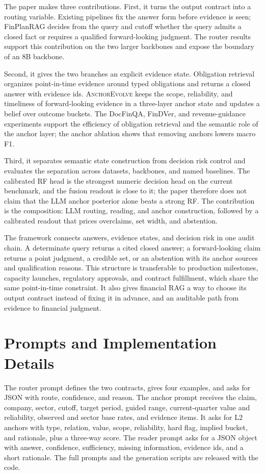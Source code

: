 \documentclass[11pt]{article}
\newcommand{\method}{FinPlanRAG}
\newcommand{\anchor}{\textsc{AnchorEvolve}}
\begin{document}
The paper makes three contributions. First, it turns the output contract into a routing variable. Existing pipelines fix the answer form before evidence is seen; \method{} decides from the query and cutoff whether the query admits a closed fact or requires a qualified forward-looking judgment. The router results support this contribution on the two larger backbones and expose the boundary of an 8B backbone.

Second, it gives the two branches an explicit evidence state. Obligation retrieval organizes point-in-time evidence around typed obligations and returns a closed answer with evidence ids. \anchor{} keeps the scope, reliability, and timeliness of forward-looking evidence in a three-layer anchor state and updates a belief over outcome buckets. The DocFinQA, FinDVer, and revenue-guidance experiments support the efficiency of obligation retrieval and the semantic role of the anchor layer; the anchor ablation shows that removing anchors lowers macro F1.

Third, it separates semantic state construction from decision risk control and evaluates the separation across datasets, backbones, and named baselines. The calibrated RF head is the strongest numeric decision head on the current benchmark, and the fusion readout is close to it; the paper therefore does not claim that the LLM anchor posterior alone beats a strong RF. The contribution is the composition: LLM routing, reading, and anchor construction, followed by a calibrated readout that prices overclaims, set width, and abstention.

The framework connects answers, evidence states, and decision risk in one audit chain. A determinate query returns a cited closed answer; a forward-looking claim returns a point judgment, a credible set, or an abstention with its anchor sources and qualification reasons. This structure is transferable to production milestones, capacity launches, regulatory approvals, and contract fulfillment, which share the same point-in-time constraint. It also gives financial RAG a way to choose its output contract instead of fixing it in advance, and an auditable path from evidence to financial judgment.



\appendix

\section{Prompts and Implementation Details}
The router prompt defines the two contracts, gives four examples, and asks for JSON with route, confidence, and reason. The anchor prompt receives the claim, company, sector, cutoff, target period, guided range, current-quarter value and reliability, observed and sector base rates, and evidence items. It asks for L2 anchors with type, relation, value, scope, reliability, hard flag, implied bucket, and rationale, plus a three-way score. The reader prompt asks for a JSON object with answer, confidence, sufficiency, missing information, evidence ids, and a short rationale. The full prompts and the generation scripts are released with the code.
\end{document}

